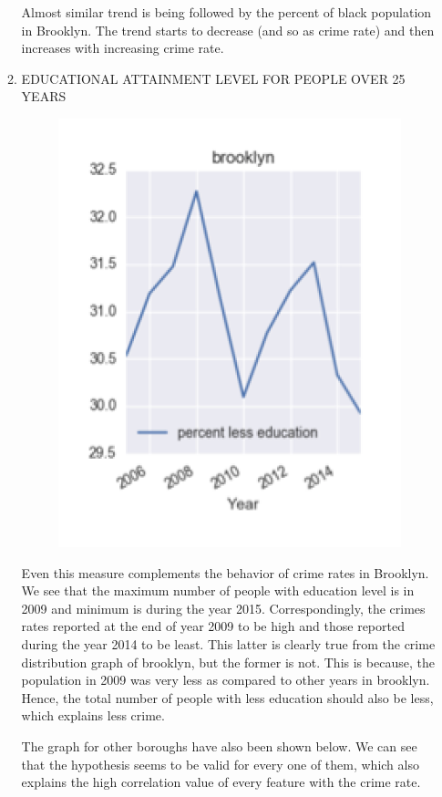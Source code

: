 \documentclass{article}
\begin{document}
\begin{itemize}
\begin{enumerate}[label=(\alph*)]
Almost similar trend is being followed by the percent of black population in Brooklyn. The trend starts to decrease (and so as crime rate) and then increases with increasing crime rate.

\item EDUCATIONAL ATTAINMENT LEVEL FOR PEOPLE OVER 25 YEARS

\begin{figure}[H]
\centering
\includegraphics[scale=1]{BrooklynEduc.png}
\end{figure}

Even this measure complements the behavior of crime rates in Brooklyn. We see that the maximum number of people with education level is in 2009 and minimum is during the year 2015. Correspondingly, the crimes rates reported at the end of year 2009 to be high and those reported during the year 2014 to be least. This latter is clearly true from the crime distribution graph of brooklyn, but the former is not. This is because, the population in 2009 was very less as compared to other years in brooklyn. Hence, the total number of people with less education should also be less, which explains less crime. 

The graph for other boroughs have also been shown below. We can see that the hypothesis seems to be valid for every one of them, which also explains the high correlation value of every feature with the crime rate.
\end{enumerate}


\end{itemize}
\end{document}
